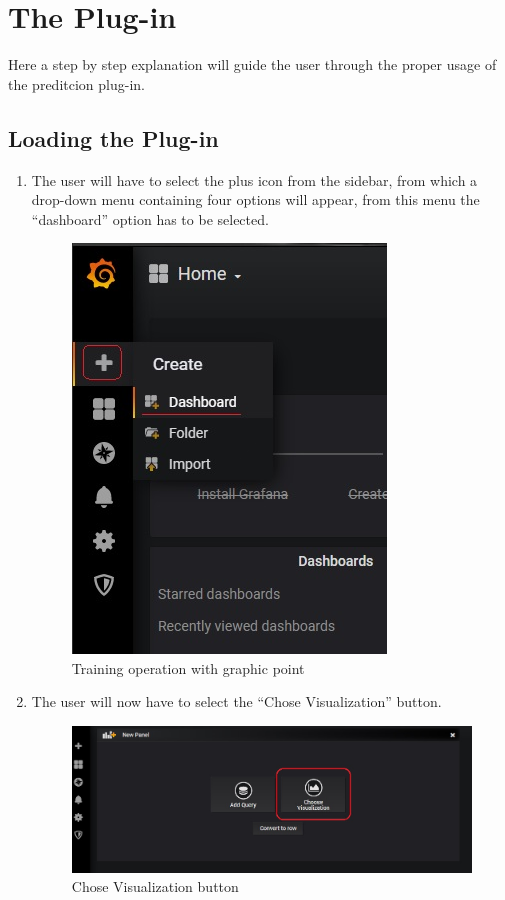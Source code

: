 \section{The Plug-in}
Here a step by step explanation will guide the user through the proper usage of the preditcion plug-in.

\subsection{Loading the Plug-in}
\begin{enumerate}
	\item The user will have to select the plus icon from the sidebar, from which a drop-down menu containing four options will appear, from this menu the “dashboard” option has to be selected.


\begin{figure}[H]
\centering
\includegraphics[scale=0.90]{img/plug-in/plus_dash.jpg}
\caption{Training operation with graphic point}
\end{figure}


	\item The user will now have to select the “Chose Visualization” button.


\begin{figure}[H]
\centering
\includegraphics[scale=0.65]{img/plug-in/visual.jpg}
\caption{Chose Visualization button}
\end{figure}



\end{enumerate}
